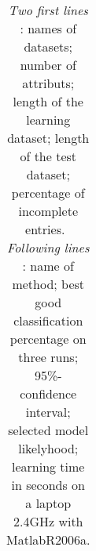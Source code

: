 \begin{table}[!t]
\begin{tabular}{@{}c@{\,}|@{\,}ccccc@{}}
\end{tabular}
\caption{\label{tabUCI}
\emph{Two first lines} : names of datasets; number of attributs; length of the learning dataset; length of the test dataset; percentage of incomplete entries. \hspace*{8.5mm} \, 
\emph{Following lines} : name of method; best good classification percentage on three runs; 95\%-confidence interval; selected model likelyhood; learning time in seconds on a laptop 2.4GHz with Matlab\textregistered R2006a.
}
\vspace*{-\baselineskip}
\end{table}
\normalsize
